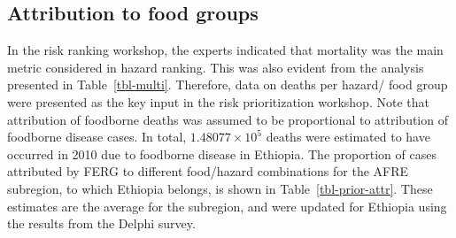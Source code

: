 \documentclass[
  letterpaper,
  DIV=11,
  numbers=noendperiod]{scrartcl}
\begin{document}
\begin{table}

\caption{\label{tbl-exp-avg2}Average of expert attribution estimates in
Round 2(\%)}


\end{table}%

\subsection{Attribution to food
groups}\label{attribution-to-food-groups}

In the risk ranking workshop, the experts indicated that mortality was
the main metric considered in hazard ranking. This was also evident from
the analysis presented in Table~\ref{tbl-multi}. Therefore, data on
deaths per hazard/ food group were presented as the key input in the
risk prioritization workshop. Note that attribution of foodborne deaths
was assumed to be proportional to attribution of foodborne disease
cases. In total, \ensuremath{1.48077\times 10^{5}} deaths were estimated
to have occurred in 2010 due to foodborne disease in Ethiopia. The
proportion of cases attributed by FERG to different food/hazard
combinations for the AFRE subregion, to which Ethiopia belongs, is shown
in Table~\ref{tbl-prior-attr}. These estimates are the average for the
subregion, and were updated for Ethiopia using the results from the
Delphi survey.
\end{document}
